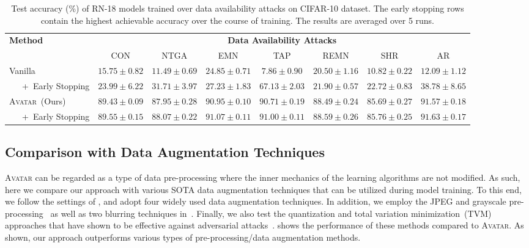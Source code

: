 \documentclass[conference]{IEEEtran}
\theoremstyle{definition}
\theoremstyle{remark}
\theoremstyle{proposition}
\begin{document}
\begin{table}[tb!]
	\caption{Test accuracy (\%) of RN-18 models trained over data availability attacks on CIFAR-10 dataset. The early stopping rows contain the highest achievable accuracy over the course of training. The results are averaged over 5 runs.}
    \label{tab:early}
	\begin{center}
		\begin{small}
		    \setlength\tabcolsep{0.40em}
			\def\arraystretch{1.5}
			\begin{tabular}{lccccccc}
				\toprule
				\multirow{2}{*}{\textbf{Method}}
				&\multicolumn{7}{c}{\textbf{Data Availability Attacks}}\\
				\cmidrule(lr){2-8}
				& CON & NTGA & EMN & TAP& REMN & SHR & AR\\
				\midrule
				Vanilla
                                                     & $15.75 \pm 0.82$ & $11.49 \pm 0.69$ & $24.85 \pm 0.71$ & $7.86 \pm 0.90$  & $20.50 \pm 1.16$ & $10.82 \pm 0.22$ & $12.09 \pm 1.12$\\
                ~~~+~Early Stopping                  & $23.99 \pm 6.22$ & $31.71 \pm 3.97$ & $27.23 \pm 1.83$ & $67.13 \pm 2.03$ & $21.90 \pm 0.57$ & $22.72 \pm 0.83$ & $38.78 \pm 8.65$\\
				\textsc{Avatar}~(Ours)               & $89.43 \pm 0.09$ & $87.95 \pm 0.28$ & $90.95 \pm 0.10$ & $90.71 \pm 0.19$ & $88.49 \pm 0.24$ & $85.69 \pm 0.27$ & $91.57 \pm 0.18$\\
                ~~~+~Early Stopping                  & $89.55 \pm 0.15$ & $88.07 \pm 0.22$ & $91.07 \pm 0.11$ & $91.00 \pm 0.11$ & $88.59 \pm 0.26$ & $85.76 \pm 0.25$ & $91.63 \pm 0.17$\\
			    \bottomrule
			\end{tabular}
		\end{small}
	\end{center}
    \vskip -0.2in
\end{table}

\subsection{Comparison with Data Augmentation Techniques}\label{sec:sec:augmentation}
\textsc{Avatar} can be regarded as a type of data pre-processing where the inner mechanics of the learning algorithms are not modified.
As such, here we compare our approach with various SOTA data augmentation techniques that can be utilized during model training.
To this end, we follow the settings of \citep{huang2021emn}, and adopt four widely used data augmentation techniques.
In addition, we employ the JPEG and grayscale pre-processing~\citep{liu2023image} as well as two blurring techniques in~.
Finally, we also test the quantization and total variation minimization~(TVM) approaches that have shown to be effective against adversarial attacks~\citep{guo2018tvm}.
 shows the performance of these methods compared to \textsc{Avatar}.
As shown, our approach outperforms various types of pre-processing/data augmentation methods.
\end{document}
